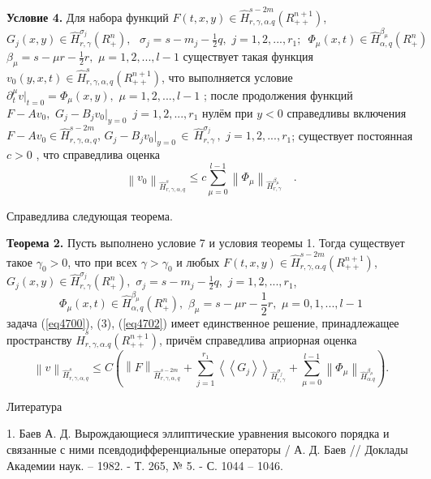 \textbf{Условие 4. }Для набора функций $F(t,x,y) \in \hat {H}_{r,\gamma
,\alpha .q}^{s - 2m} (R_{ + + }^{n + 1} )$, $G_j (x,y) \in \hat
{H}_{r,\gamma }^{\sigma _j } (R_ + ^n ),\,\,\,\,\sigma _j = s - m_j -
\frac{1}{2}q,\,\,j = 1,2,...,r_1 ;\,\,\,\Phi _\mu (x,t) \in \hat {H}_{\alpha
,q}^{\beta _\mu } (R_ + ^n )$
$\beta _\mu = s - \mu r - \frac{1}{2}r,\,\,\mu = 1,2,...,l -1$
существует такая функция
$v_0 (y,x,t) \in \hat {H}_{r,\gamma ,\alpha ,q}^s (R_{ + + }^{n + 1}
)$,
что
выполняется условие $\partial _t^\mu \left. v \right|_{t = 0} = \Phi _\mu
(x,y),\,\,\mu = 1,2,...,l - 1$ ;
после продолжения функций $F - Av_0 ,\,\,G_j - B_j v_0 \vert _{y = 0}
\,\,\,j = 1,2,...,r_1 $ нулём при $y < 0$ справедливы включения $F - Av_0 \in
\hat {H}_{r,\gamma ,\alpha ,q}^{s - 2m} ,\,G_j - B_j v_0 \vert _{y = 0} \,
\in \,\hat {H}_{r,\gamma }^{\sigma _j } \,,\,\,j = 1,2,...,r_1 $;
существует постоянная $c > 0$ , что справедлива оценка
\[
\left\| {v_0 } \right\|_{\hat {H}_{r,\gamma ,\alpha ,q}^s } \leqslant
c\sum\limits_{\mu = 0}^{l - 1} {\left\| {\Phi _\mu } \right\|} _{\hat
{H}_{r,\gamma }^{\beta _\mu } } \quad .
\]







Справедлива следующая теорема.

\textbf{Теорема 2. }Пусть выполнено условие 7 и условия теоремы 1. Тогда
существует такое $\gamma _0 > 0$, что при всех $\gamma > \gamma _0 $ и любых
$F(t,x,y) \in \hat {H}_{r,\gamma ,\alpha .q}^{s - 2m} (R_{ + + }^{n + 1} )$,
$G_j (x,y) \in \hat {H}_{r,\gamma }^{\sigma _j } (R_ + ^n ),\,\,\sigma _j =
s - m_j - \frac{1}{2}q,\,\,j = 1,2,...,r_1 $,
\[
\Phi _\mu (x,t) \in \hat {H}_{\alpha ,q}^{\beta _\mu } (R_ + ^n ),\,\,\beta
_\mu = s - \mu r - \frac{1}{2}r,\,\,\mu = 0,1,...,l - 1
\]
задача (\ref{eq4700}), (3), (\ref{eq4702}) имеет единственное решение, принадлежащее пространству
$\hat {H}_{r,\gamma ,\alpha .q}^s (R_{ + + }^{n + 1} )$, причём справедлива
априорная оценка
\[
\left\| v \right\|_{\hat {H}_{r,\gamma ,\alpha ,q}^s } \leqslant C(\left\| F
\right\|_{\hat {H}_{r,\gamma ,\alpha ,q}^{s - 2m} } + \sum\limits_{j =
1}^{r_1 } {\left\langle {\left\langle {G_j } \right\rangle } \right\rangle }
_{\hat {H}_{r,\gamma }^{\sigma _j } } + \sum\limits_{\mu = 0}^{l - 1}
{\left\| {\Phi _\mu } \right\|} _{\hat {H}_{\alpha .q}^{\beta _\mu } } ) .
\]



Литература

1. Баев А. Д. Вырождающиеся эллиптические уравнения высокого порядка и
связанные с ними псевдодифференциальные операторы / А. Д. Баев // Доклады
Академии наук. -- 1982. - Т. 265, № 5. - С. 1044 -- 1046.

